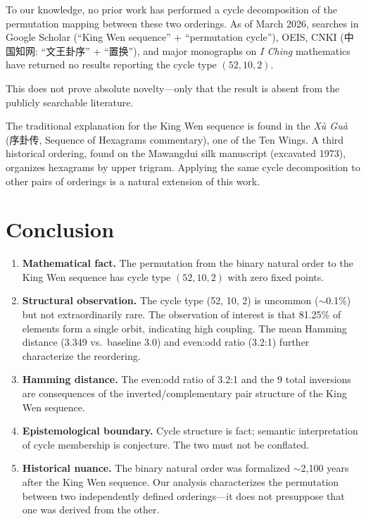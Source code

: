 \documentclass[11pt,a4paper]{article}
\begin{document}
To our knowledge, no prior work has performed a cycle decomposition of the permutation mapping between these two orderings.
As of March 2026, searches in Google Scholar (``King Wen sequence'' + ``permutation cycle''), OEIS, CNKI (中国知网: ``文王卦序'' + ``置换''), and major monographs on \textit{I Ching} mathematics have returned no results reporting the cycle type $(52,10,2)$.

This does not prove absolute novelty---only that the result is absent from the publicly searchable literature.

The traditional explanation for the King Wen sequence is found in the \textit{X\`u Gu\`a} (序卦传, Sequence of Hexagrams commentary), one of the Ten Wings. A third historical ordering, found on the Mawangdui silk manuscript (excavated 1973), organizes hexagrams by upper trigram. Applying the same cycle decomposition to other pairs of orderings is a natural extension of this work.


\section{Conclusion}\label{sec:conclusion}

\begin{enumerate}
  \item \textbf{Mathematical fact.} The permutation from the binary natural order to the King Wen sequence has cycle type $(52,10,2)$ with zero fixed points.

  \item \textbf{Structural observation.} The cycle type (52, 10, 2) is uncommon ($\sim$0.1\%) but not extraordinarily rare. The observation of interest is that 81.25\% of elements form a single orbit, indicating high coupling. The mean Hamming distance (3.349 vs.\ baseline 3.0) and even:odd ratio (3.2:1) further characterize the reordering.

  \item \textbf{Hamming distance.} The even:odd ratio of 3.2:1 and the 9 total inversions are consequences of the inverted/complementary pair structure of the King Wen sequence.

  \item \textbf{Epistemological boundary.} Cycle structure is fact; semantic interpretation of cycle membership is conjecture. The two must not be conflated.

  \item \textbf{Historical nuance.} The binary natural order was formalized $\sim$2{,}100 years after the King Wen sequence. Our analysis characterizes the permutation between two independently defined orderings---it does not presuppose that one was derived from the other.
\end{enumerate}
\end{document}
